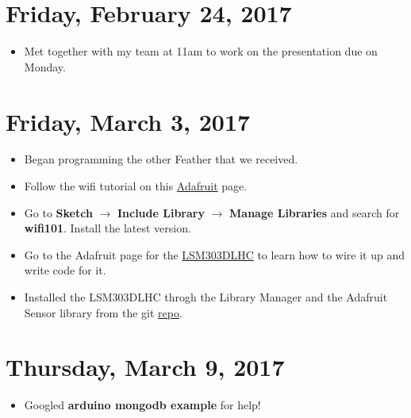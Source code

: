 \documentclass[12pt]{article}
\begin{document}
\section{Friday, February 24, 2017}
\begin{itemize}
\item Met together with my team at 11am to work on the presentation due on Monday.
\end{itemize}

\section{Friday, March 3, 2017}
\begin{itemize}
\item Began programming the other Feather that we received.
\item Follow the wifi tutorial on this \href{https://learn.adafruit.com/adafruit-feather-m0-wifi-atwinc1500/using-the-wifi-module}{Adafruit} page.
\item Go to \textbf{Sketch} $\rightarrow$ \textbf{Include Library} $\rightarrow$ \textbf{Manage Libraries} and search for \textbf{wifi101}. Install the latest version.
\item Go to the Adafruit page for the \href{https://learn.adafruit.com/lsm303-accelerometer-slash-compass-breakout/assembly-and-wiring}{LSM303DLHC} to learn how to wire it up and write code for it.
\item Installed the LSM303DLHC throgh the Library Manager and the Adafruit Sensor library from the git \href{https://github.com/adafruit/Adafruit_Sensor}{repo}.
\end{itemize}

\section{Thursday, March 9, 2017}
\begin{itemize}
\item Googled \textbf{arduino mongodb example} for help!
\end{itemize}

\end{document}
